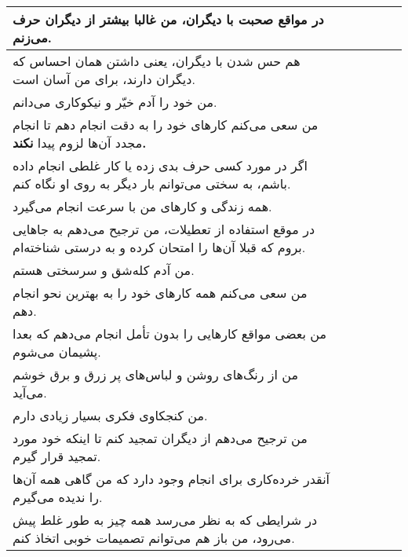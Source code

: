 \documentclass[a4paper,10pt]{article}
\begin{document}
\begin{center}
\begin{tabular}{|p{6cm}|c|c|c|c|c|}
در مواقع صحبت با دیگران، من غالبا بیشتر از دیگران حرف می‌زنم.& & & & & \\
\hline


هم حس شدن با دیگران، یعنی داشتن همان احساس که دیگران دارند، برای من آسان است.& & & & & \\
\hline


من خود را آدم خیّر و نیکوکاری می‌دانم.& & & & & \\
\hline


من سعی می‌کنم کارهای خود را به دقت انجام دهم تا انجام مجدد آن‌ها لزوم پیدا \textbf{نکند.}& & & & & \\
\hline


اگر در مورد کسی حرف بدی زده یا کار غلطی انجام داده باشم، به سختی می‌توانم بار دیگر به روی او نگاه کنم.& & & & & \\
\hline


همه زندگی و کارهای من با سرعت انجام می‌گیرد.& & & & & \\
\hline


در موقع استفاده از تعطیلات، من ترجیح می‌دهم به جاهایی بروم که قبلا آن‌ها را امتحان کرده و به درستی شناخته‌ام.& & & & & \\
\hline


من آدم کله‌شق و سرسختی هستم.& & & & & \\
\hline


من سعی می‌کنم همه کارهای خود را به بهترین نحو انجام دهم.& & & & & \\
\hline


من بعضی مواقع کارهایی را بدون تأمل انجام می‌دهم که بعدا پشیمان می‌شوم.& & & & & \\
\hline


من از رنگ‌های روشن و لباس‌های پر زرق و برق خوشم می‌آید.& & & & & \\
\hline


من کنجکاوی فکری بسیار زیادی دارم.& & & & & \\
\hline


من ترجیح می‌دهم از دیگران تمجید کنم تا اینکه خود مورد تمجید قرار گیرم.& & & & & \\
\hline


آنقدر خرده‌کاری برای انجام وجود دارد که من گاهی همه آن‌ها را ندیده می‌گیرم.& & & & & \\
\hline


در شرایطی که به نظر می‌رسد همه چیز به طور غلط پیش می‌رود، من باز هم می‌توانم تصمیمات خوبی اتخاذ کنم.& & & & & \\
\hline




\end{tabular}
\end{center}
\end{document}
